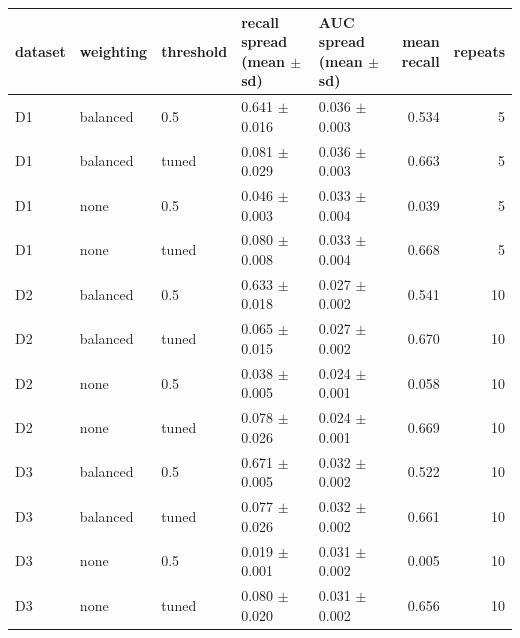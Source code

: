\begin{tabular}{lllllrr}
\toprule
dataset & weighting & threshold & recall spread (mean $\pm$ sd) & AUC spread (mean $\pm$ sd) & mean recall & repeats \\
\midrule
D1 & balanced & 0.5 & 0.641 $\pm$ 0.016 & 0.036 $\pm$ 0.003 & 0.534 & 5 \\
D1 & balanced & tuned & 0.081 $\pm$ 0.029 & 0.036 $\pm$ 0.003 & 0.663 & 5 \\
D1 & none & 0.5 & 0.046 $\pm$ 0.003 & 0.033 $\pm$ 0.004 & 0.039 & 5 \\
D1 & none & tuned & 0.080 $\pm$ 0.008 & 0.033 $\pm$ 0.004 & 0.668 & 5 \\
D2 & balanced & 0.5 & 0.633 $\pm$ 0.018 & 0.027 $\pm$ 0.002 & 0.541 & 10 \\
D2 & balanced & tuned & 0.065 $\pm$ 0.015 & 0.027 $\pm$ 0.002 & 0.670 & 10 \\
D2 & none & 0.5 & 0.038 $\pm$ 0.005 & 0.024 $\pm$ 0.001 & 0.058 & 10 \\
D2 & none & tuned & 0.078 $\pm$ 0.026 & 0.024 $\pm$ 0.001 & 0.669 & 10 \\
D3 & balanced & 0.5 & 0.671 $\pm$ 0.005 & 0.032 $\pm$ 0.002 & 0.522 & 10 \\
D3 & balanced & tuned & 0.077 $\pm$ 0.026 & 0.032 $\pm$ 0.002 & 0.661 & 10 \\
D3 & none & 0.5 & 0.019 $\pm$ 0.001 & 0.031 $\pm$ 0.002 & 0.005 & 10 \\
D3 & none & tuned & 0.080 $\pm$ 0.020 & 0.031 $\pm$ 0.002 & 0.656 & 10 \\
\bottomrule
\end{tabular}
